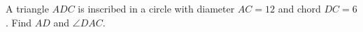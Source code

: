A triangle $ADC$ is inscribed in a circle with diameter $AC=12$ and chord $DC=6$. Find $AD$ and $\angle DAC$.
